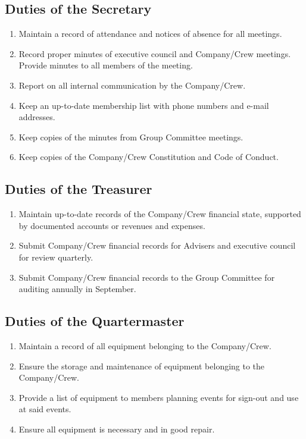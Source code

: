 \documentclass{Service_Corps_Document}
\begin{document}
\subsection{Duties of the Secretary}
\begin{enumerate}
	\item Maintain a record of attendance and notices of absence for all meetings.
	\item Record proper minutes of executive council and Company/Crew meetings. Provide minutes to all members of the meeting.
	\item Report on all internal communication by the Company/Crew.
	\item Keep an up-to-date membership list with phone numbers and e-mail addresses.
	\item Keep copies of the minutes from Group Committee meetings. 
	\item Keep copies of the Company/Crew Constitution and Code of Conduct.
\end{enumerate}
\subsection{Duties of the Treasurer}
\begin{enumerate}
	\item Maintain up-to-date records of the Company/Crew financial state, supported by documented accounts or revenues and expenses.
	\item Submit Company/Crew financial records for Advisers and executive council for review quarterly.
	\item Submit Company/Crew financial records to the Group Committee for auditing annually in September. 
\end{enumerate}
\subsection{Duties of the Quartermaster}
\begin{enumerate}
	\item Maintain a record of all equipment belonging to the Company/Crew.
	\item Ensure the storage and maintenance of equipment belonging to the Company/Crew.
	\item Provide a list of equipment to members planning events for sign-out and use at said events.
	\item Ensure all equipment is necessary and in good repair. 
\end{enumerate}
\end{document}
